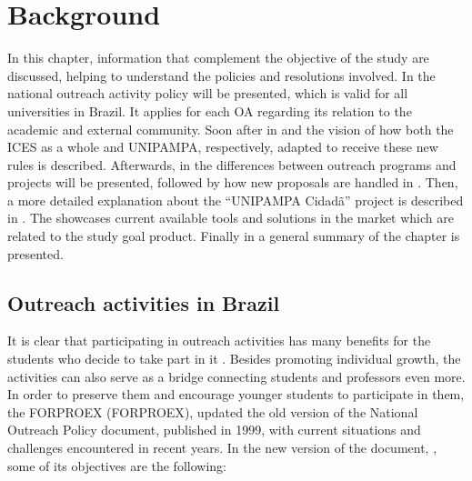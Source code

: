 \chapter{Background}\label{background}

In this chapter, information that complement the objective of the study are discussed, helping to understand the policies and resolutions involved. In  the national outreach activity policy will be presented, which is valid for all universities in Brazil. It applies for each \ac{OA} regarding its relation to the academic and external community. Soon after in  and  the vision of how both the \ac{ICES} as a whole and \acl{UNIPAMPA}, respectively, adapted to receive these new rules is described. Afterwards, in  the differences between outreach programs and projects will be presented, followed by how new proposals are handled in . Then, a more detailed explanation about the ``\ac{UNIPAMPA} Cidadã'' project is described in . The  showcases current available tools and solutions in the market which are related to the study goal product. Finally in  a general summary of the chapter is presented.

\section{Outreach activities in Brazil}\label{sec:bac-outreach-brazil}

It is clear that participating in outreach activities has many benefits for the students who decide to take part in it \cite{sellou2011many}. Besides promoting individual growth, the activities can also serve as a bridge connecting students and professors even more. In order to preserve them and encourage younger students to participate in them, the \acl{FORPROEX} (\ac{FORPROEX}), updated the old version of the National Outreach Policy document, published in 1999, with current situations and challenges encountered in recent years. In the new version of the document, \cite{politicaNacional}, some of its objectives are the following:

